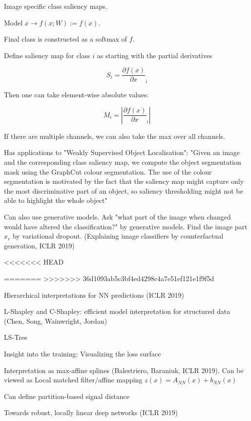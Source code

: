 \documentclass[english]{article}
\begin{document}
Image specific class saliency maps. 

Model $x \to f(x;W):=f(x)$. 

Final class is constructed as a softmax of $f$.

Define saliency map for class $i$ as starting with the partial derivatives

$$S_i = \frac{\partial f(x)}{\partial x}_i$$

Then one can take element-wise absolute values: 

$$M_i = |\frac{\partial f(x)}{\partial x}_i|$$

If there are multiple channels, we can also take the max over all channels.

Has applications to "Weakly Supervised Object Localisation":  "Given an image and the corresponding class saliency map, we compute the object segmentation mask
using the GraphCut colour segmentation. The use of the colour segmentation is motivated by the
fact that the saliency map might capture only the most discriminative part of an object, so saliency
thresholding might not be able to highlight the whole object"

\item Can also use generative models. Ask "what part of the image when changed would have altered the classification?" by generative models. Find the image part $x_r$ by variational dropout. (Explaining image classifiers by counterfactual generation, ICLR 2019) 

<<<<<<< HEAD

=======
>>>>>>> 36d1093ab5c3bf4ed4298c4a7e51ef121e1f9f5d
\item Hierarchical interpretations for NN predictions (ICLR 2019)

\item L-Shapley and C-Shapley: efficient model interpretation for structured data (Chen, Song, Wainwright, Jordan)

LS-Tree


\item  Insight into the training: Visualizing the loss surface

\item Interpretation as max-affine splines (Balestriero, Baraniuk, ICLR 2019). Can be viewed as Local matched filter/affine mapping $z(x) = A_{NN}(x)+b_{NN}(x)$

Can define partition-based signal distance

\item Towards robust, locally linear deep networks (ICLR 2019)
\end{document}
